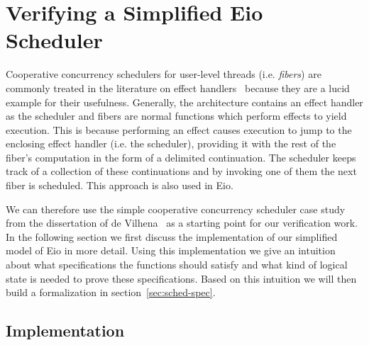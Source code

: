 \section{Verifying a Simplified Eio Scheduler}
\label{sec:scheduler}


Cooperative concurrency schedulers for user-level threads (i.e. \emph{fibers}) are commonly treated in the literature on effect handlers~\cite{dolan2018concurrent,leijen2017structured,de2021separation} because they are a lucid example for their usefulness.
Generally, the architecture contains an effect handler as the scheduler and fibers are normal functions which perform effects to yield execution.
This is because performing an effect causes execution to jump to the enclosing effect handler (i.e. the scheduler), providing it with the rest of the fiber's computation in the form of a delimited continuation.
The scheduler keeps track of a collection of these continuations and by invoking one of them the next fiber is scheduled.
This approach is also used in Eio.

We can therefore use the simple cooperative concurrency scheduler case study from the dissertation of de Vilhena~\cite{de2022proof} as a starting point for our verification work.
In the following section we first discuss the implementation of our simplified model of Eio in more detail.
Using this implementation we give an intuition about what specifications the functions should satisfy and what kind of logical state is needed to prove these specifications.
Based on this intuition we will then build a formalization in section~\ref{sec:sched-spec}.

\subsection{Implementation}
\label{sec:sched-impl}

